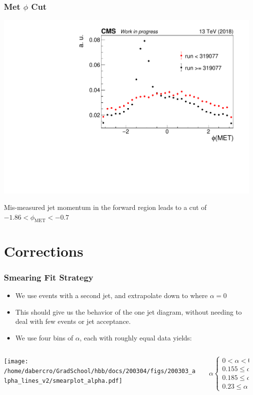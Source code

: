 \documentclass{beamer}
\begin{document}
\begin{frame}
  \frametitle{Met $\phi$ Cut}

  \begin{center}
    \includegraphics[width=0.7\linewidth]{figures/METPhi319077.pdf}
  \end{center}
  
  Mis-measured jet momentum in the forward region leads to a cut of
  $-1.86 < \phi_\mathrm{MET} < -0.7$

\end{frame}

\section{Corrections}

\begin{frame}
  \frametitle{Smearing Fit Strategy}

  \begin{itemize}
  \item We use events with a second jet, and extrapolate down to where $\alpha = 0$
  \item This should give us the behavior of the one jet diagram,
    without needing to deal with few events or jet acceptance.
  \item We use four bins of $\alpha$, each with roughly equal data yields:
  \end{itemize}
  \begin{columns}
    \begin{column}{0.5\linewidth}
      \texttt{[image: /home/dabercro/GradSchool/hbb/docs/200304/figs/200303\_alpha\_lines\_v2/smearplot\_alpha.pdf]}
    \end{column}
    \begin{column}{0.5\linewidth}
      \[
      \alpha
      \begin{cases}
        0 < \alpha < 0.155 \\
        0.155 \le \alpha < 0.185 \\
        0.185 \le \alpha < 0.23 \\
        0.23 \le \alpha < 0.3
      \end{cases}
      \]
    \end{column}
  \end{columns}

\end{frame}
\end{document}
